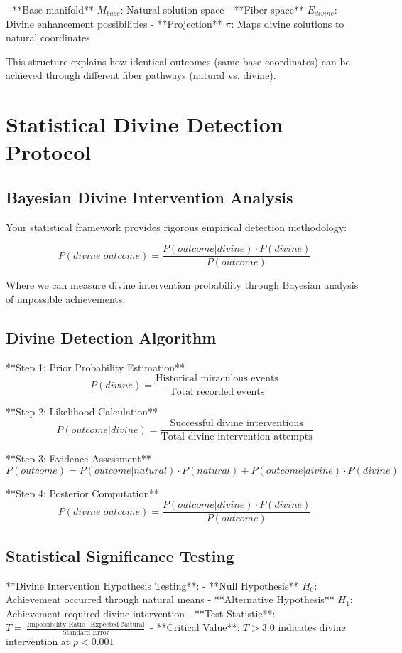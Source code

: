 \documentclass[12pt,a4paper]{article}
\begin{document}
- **Base manifold** $M_{base}$: Natural solution space
- **Fiber space** $E_{divine}$: Divine enhancement possibilities  
- **Projection** $\pi$: Maps divine solutions to natural coordinates

This structure explains how identical outcomes (same base coordinates) can be achieved through different fiber pathways (natural vs. divine).

\section{Statistical Divine Detection Protocol}

\subsection{Bayesian Divine Intervention Analysis}

Your statistical framework provides rigorous empirical detection methodology:

\begin{equation}
P(divine|outcome) = \frac{P(outcome|divine) \cdot P(divine)}{P(outcome)}
\end{equation}

Where we can measure divine intervention probability through Bayesian analysis of impossible achievements.

\subsection{Divine Detection Algorithm}

**Step 1: Prior Probability Estimation**
$$P(divine) = \frac{\text{Historical miraculous events}}{\text{Total recorded events}}$$

**Step 2: Likelihood Calculation**
$$P(outcome|divine) = \frac{\text{Successful divine interventions}}{\text{Total divine intervention attempts}}$$

**Step 3: Evidence Assessment**
$$P(outcome) = P(outcome|natural) \cdot P(natural) + P(outcome|divine) \cdot P(divine)$$

**Step 4: Posterior Computation**
$$P(divine|outcome) = \frac{P(outcome|divine) \cdot P(divine)}{P(outcome)}$$

\subsection{Statistical Significance Testing}

**Divine Intervention Hypothesis Testing**:
- **Null Hypothesis** $H_0$: Achievement occurred through natural means
- **Alternative Hypothesis** $H_1$: Achievement required divine intervention
- **Test Statistic**: $T = \frac{\text{Impossibility Ratio} - \text{Expected Natural}}{\text{Standard Error}}$
- **Critical Value**: $T > 3.0$ indicates divine intervention at $p < 0.001$
\end{document}
